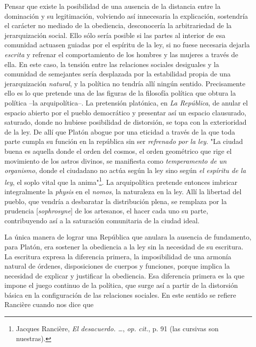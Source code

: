 \documentclass{book}
\begin{document}
Pensar que existe la posibilidad de una ausencia de la distancia entre
la dominación y su legitimación, volviendo así innecesaria la
explicación, sostendría el carácter no mediado de la obediencia,
desconocería la arbitrariedad de la jerarquización social. Ello sólo
sería posible si las partes al interior de esa comunidad actuasen
guiadas por el espíritu de la ley, si no fuese necesaria dejarla
\emph{escrita} y refrenar el comportamiento de los hombres y las mujeres
a través de ella. En este caso, la tensión entre las relaciones sociales
desiguales y la comunidad de semejantes sería desplazada por la
estabilidad propia de una jerarquización \emph{natural}, y la política
no tendría allí ningún sentido. Precisamente ello es lo que pretende una
de las figuras de la filosofía política que obtura la política --la
arquipolítica--. La pretensión platónica, en \emph{La República}, de
anular el espacio abierto por el pueblo democrático y presentar así un
espacio clausurado, saturado, donde no hubiese posibilidad de
distorsión, se topa con la exterioridad de la ley. De allí que Platón
abogue por una eticidad a través de la que toda parte cumpla su función
en la república sin ser \emph{refrenado por la ley}. "La ciudad buena es
aquella donde el orden del cosmos, el orden geométrico que rige el
movimiento de los astros divinos, se manifiesta como \emph{temperamento
de un organismo}, donde el ciudadano no actúa según la ley sino según
\emph{el espíritu de la ley}, el soplo vital que la anima"\footnote{Jacques
  Rancière, \emph{El desacuerdo. \ldots{}}, \emph{op. cit.}, p. 91 (las
  cursivas son nuestras).}. La arquipolítica pretende entonces imbricar
integralmente la \emph{physis} en el \emph{nomos}, la naturaleza en la
ley. Allí la libertad del pueblo, que vendría a desbaratar la
distribución plena, se remplaza por la prudencia {[}\emph{sophrosyne}{]}
de los artesanos, el hacer cada uno su parte, contribuyendo así a la
saturación comunitaria de la ciudad ideal.

La única manera de lograr una República que anulara la ausencia de
fundamento, para Platón, era sostener la obediencia a la ley sin la
necesidad de su escritura. La escritura expresa la diferencia primera,
la imposibilidad de una armonía natural de órdenes, disposiciones de
cuerpos y funciones, porque implica la necesidad de explicar y
justificar la obediencia. Esa diferencia primera es la que impone el
juego continuo de la política, que surge así a partir de la distorsión
básica en la configuración de las relaciones sociales. En este sentido
se refiere Rancière cuando nos dice que
\end{document}
